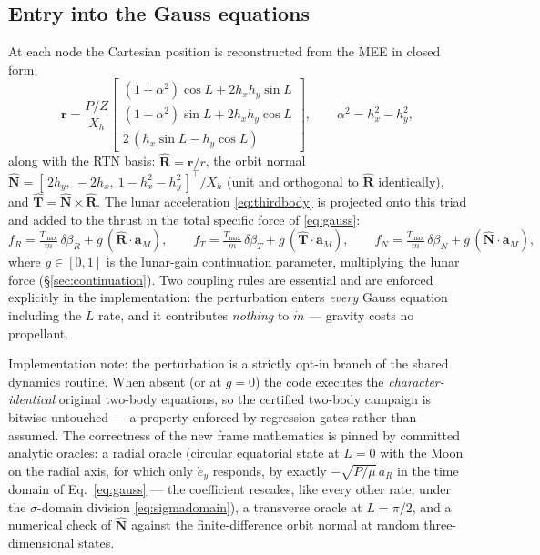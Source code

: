 \documentclass[11pt]{article}
\newcommand{\vect}[1]{\bm{#1}}
\newcommand{\Rhat}{\hat{\vect{R}}}
\newcommand{\That}{\hat{\vect{T}}}
\newcommand{\Nhat}{\hat{\vect{N}}}
\begin{document}
\subsection{Entry into the Gauss equations}

At each node the Cartesian position is reconstructed from the MEE in closed
form,
\[
\vect{r} = \frac{P/Z}{X_h}
\begin{bmatrix}
(1+\alpha^2)\cos L + 2 h_x h_y \sin L\\
(1-\alpha^2)\sin L + 2 h_x h_y \cos L\\
2\,(h_x \sin L - h_y \cos L)
\end{bmatrix},
\qquad \alpha^2 = h_x^2 - h_y^2,
\]
along with the RTN basis: $\Rhat = \vect{r}/r$, the orbit normal
$\Nhat = [\,2h_y,\ -2h_x,\ 1 - h_x^2 - h_y^2\,]^{\top}/X_h$ (unit and
orthogonal to $\Rhat$ identically), and $\That = \Nhat \times \Rhat$. The
lunar acceleration \eqref{eq:thirdbody} is projected onto this triad and
added to the thrust in the total specific force of \eqref{eq:gauss}:
\begin{equation}
f_R = \tfrac{T_{\max}}{m}\,\delta\beta_R + g\,(\Rhat\!\cdot\!\vect{a}_M),
\qquad
f_T = \tfrac{T_{\max}}{m}\,\delta\beta_T + g\,(\That\!\cdot\!\vect{a}_M),
\qquad
f_N = \tfrac{T_{\max}}{m}\,\delta\beta_N + g\,(\Nhat\!\cdot\!\vect{a}_M),
\end{equation}
where $g \in [0,1]$ is the lunar-gain continuation parameter, multiplying
the lunar force (\S\ref{sec:continuation}). Two coupling rules are essential and are
enforced explicitly in the implementation: the perturbation enters
\emph{every} Gauss equation including the $\dot L$ rate, and it contributes
\emph{nothing} to $\dot m$ --- gravity costs no propellant.

Implementation note: the perturbation is a strictly opt-in branch of the
shared dynamics routine. When absent (or at $g = 0$) the code executes the
\emph{character-identical} original two-body equations, so the certified
two-body campaign is bitwise untouched --- a property enforced by
regression gates rather than assumed. The correctness of the new frame
mathematics is pinned by committed analytic oracles: a radial oracle
(circular equatorial state at $L = 0$ with the Moon on the radial axis,
for which only $\dot e_y$ responds, by exactly $-\sqrt{P/\mu}\,a_R$ in the
time domain of Eq.~\eqref{eq:gauss} --- the coefficient rescales, like
every other rate, under the $\sigma$-domain division \eqref{eq:sigmadomain}),
a transverse oracle at $L = \pi/2$, and a numerical check of $\Nhat$
against the finite-difference orbit normal at random three-dimensional
states.
\end{document}
